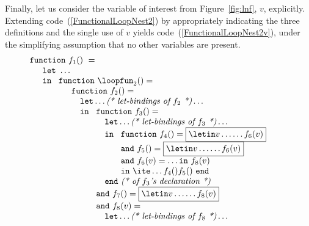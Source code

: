 Finally, let us consider the variable of interest from
Figure~\ref{fig:lnf}, $v$, explicitly.  Extending
code~(\ref{FunctionalLoopNest2}) by appropriately indicating the three
definitions and the single use of $v$ yields
code~(\ref{FunctionalLoopNest2v}), under the simplifying assumption
that no other variables are present.
\begin{equation}
\label{FunctionalLoopNest2v}
\begin{array}{l}
\mathtt{function}\ f_1()\ = \\
  \quad
  \begin{array}{l}
     \mathtt{let}\ \ldots  \\
     \mathtt{in}\ 
     \begin{array}[t]{l}
       \mathtt{function}\ \loopfun_2 () =  \\
       \quad \begin{array}[t]{l}
               \mathtt{function}\ f_2() = \\
               \quad \mathtt{let} \ldots \textit{(* let-bindings of $f_2$ *)} \ldots\\
               \quad \mathtt{in}\ 
                       \begin{array}[t]{l} 
                         \mathtt{function}\ f_3() = \\
                         \quad \mathtt{let} \ldots \textit{(* let-bindings of $f_3$ *)} \ldots\\
                         \quad \mathtt{in}\ 
                               \begin{array}[t]{l}
                                 \mathtt{function}\ f_4() = \fbox{$\letin v \ldots {\ldots f_6(v)}$}\\
                                 \mathtt{and}\ f_5() = \fbox{$\letin v \ldots {\ldots f_6(v)}$}\\
                                 \mathtt{and}\ f_6(v) = \ldots \mathtt{in}\ f_8(v)\\
                                 \mathtt{in}\ \ite \ldots {f_4()} {f_5()}\ \mathtt{end}
                               \end{array}\\
                         \quad \mathtt{end}\ \textit{(* of $f_3$'s declaration *)}\\
                         \mathtt{and}\ f_7() = \fbox{$\letin v \ldots {\ldots f_8(v)}$}\\
                         \mathtt{and}\ f_8(v) = \\
                         \quad \mathtt{let} \ldots \textit{(* let-bindings of $f_8$ *)} \ldots\\

\end{array}
\end{array}
\end{array}
\end{array}
\end{array}
\end{equation}
